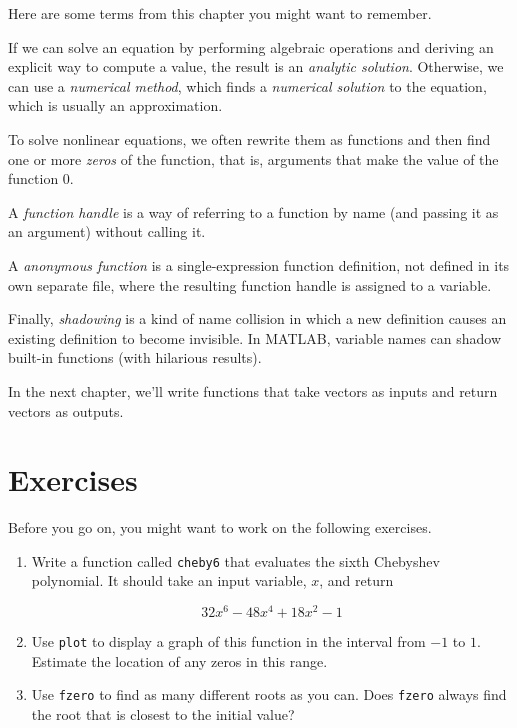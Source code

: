 Here are some terms from this chapter you might want to remember.

If we can solve an equation by performing algebraic operations and deriving an explicit way to compute a value, the result is an \emph{analytic solution}.
Otherwise, we can use a \emph{numerical method}, which finds a \emph{numerical solution} to the equation, which is usually an approximation.

To solve nonlinear equations, we often rewrite them as functions and then find one or more \emph{zeros} of the function, that is, arguments that make the value of the function $0$.

A \emph{function handle} is a way of
referring to a function by name (and passing it as an argument)
without calling it.

A \emph{anonymous function} is a single-expression function definition, not defined in its own separate file, where the resulting function handle is assigned to a variable.

Finally, \emph{shadowing} is a kind of name collision in which a new definition
causes an existing definition to become invisible.  In MATLAB,
variable names can shadow built-in functions (with hilarious results).

In the next chapter, we'll write functions that take vectors as inputs and return vectors as outputs.


\section{Exercises}

Before you go on, you might want to work on the following exercises.

\begin{ex}

\begin{enumerate}


\item Write a function called \lstinline{cheby6} that evaluates the
sixth Chebyshev polynomial.  It should take an input variable,
$x$, and return

\begin{equation*}
32 x^6 - 48 x^4 + 18 x^2 - 1
\end{equation*}

\item Use \lstinline{plot} to display a graph of this function in the
interval from $-1$ to $1$.  Estimate the location of any zeros in this
range.

\item Use \lstinline{fzero} to find as many different roots as you can.
Does \lstinline{fzero} always find the root that is closest to the initial
value?

\end{enumerate}

\end{ex}


